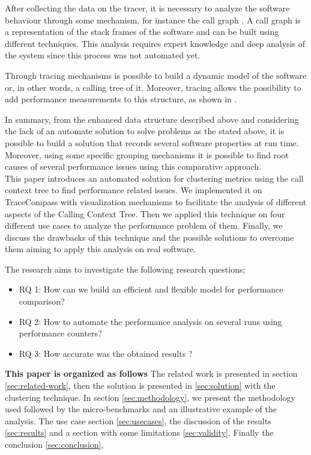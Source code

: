 After collecting the data on the tracer, it is necessary to analyze the software behaviour through some mechanism, for instance the call graph \cite{call_graph}. A call graph is a representation of the stack frames of the software and can be built using different techniques. This analysis requires expert knowledge and deep analysis of the system since this process was not automated yet.

Through tracing mechanisms is possible to build a dynamic model of the software or, in other words, a calling tree of it. Moreover, tracing allows the possibility to add performance measurements to this structure, as shown in \cite{doray_article}.

In summary, from the enhanced data structure described above and considering the lack of an automate solution to solve problems as the stated above, it is possible to build a solution that records several software properties at run time. Moreover, using some specific grouping mechanisms it is possible to find root causes of several performance issues using this comparative approach.\\

This paper introduces an automated solution for clustering metrics using the call context tree to find performance related issues. We implemented it on TraceCompass with visualization mechanisms to facilitate the analysis of different aspects of the Calling Context Tree. Then we applied this technique on four different use cases to analyze the performance problem of them. Finally, we discuss the drawbacks of this technique and the possible solutions to overcome them aiming to apply this analysis on real software.

The research aims to investigate the following research questions;

\begin{itemize}
\item RQ 1: How can we build an efficient and flexible model for performance comparison?
\item RQ 2: How to automate the performance analysis on several runs using performance counters?
\item RQ 3: How accurate was the obtained results ?
\end{itemize}

\textbf{This paper is organized as follows} The related work is presented in section \ref{sec:related-work}, then the solution is presented in \ref{sec:solution} with the clustering technique. In section \ref{sec:methodology}, we present the methodology used followed by the micro-benchmarks and an illustrative example of the analysis. The use case section \ref{sec:usecases}, the discussion of the results \ref{sec:results} and a section with some limitations \ref{sec:validity}. Finally the conclusion \ref{sec:conclusion},
